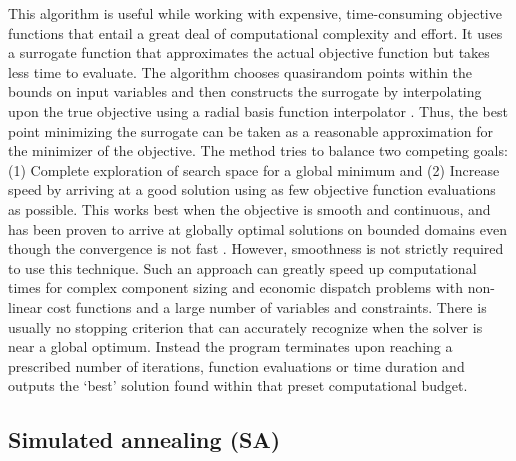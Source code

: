 \documentclass[final,3p,times]{elsarticle}
\begin{document}
This algorithm is useful while working with expensive, time-consuming objective functions that entail a great deal of computational complexity and effort. It uses a surrogate function that approximates the actual objective function but takes less time to evaluate. The algorithm chooses quasirandom points within the bounds on input variables and then constructs the surrogate by interpolating upon the true objective using a radial basis function interpolator \cite{gutmann2001}. Thus, the best point minimizing the surrogate can be taken as a reasonable approximation for the minimizer of the objective. The method tries to balance two competing goals: (1) Complete exploration of search space for a global minimum and (2) Increase speed by arriving at a good solution using as few objective function evaluations as possible. This works best when the objective is smooth and continuous, and has been proven to arrive at globally optimal solutions on bounded domains even though the convergence is not fast \cite{gutmann2001}. However, smoothness is not strictly required to use this technique. Such an approach can greatly speed up computational times for complex component sizing and economic dispatch problems with non-linear cost functions and a large number of variables and constraints. There is usually no stopping criterion that can accurately recognize when the solver is near a global optimum. Instead the program terminates upon reaching a prescribed number of iterations, function evaluations or time duration and outputs the `best' solution found within that preset computational budget.

\subsection{Simulated annealing (SA)}
\end{document}
